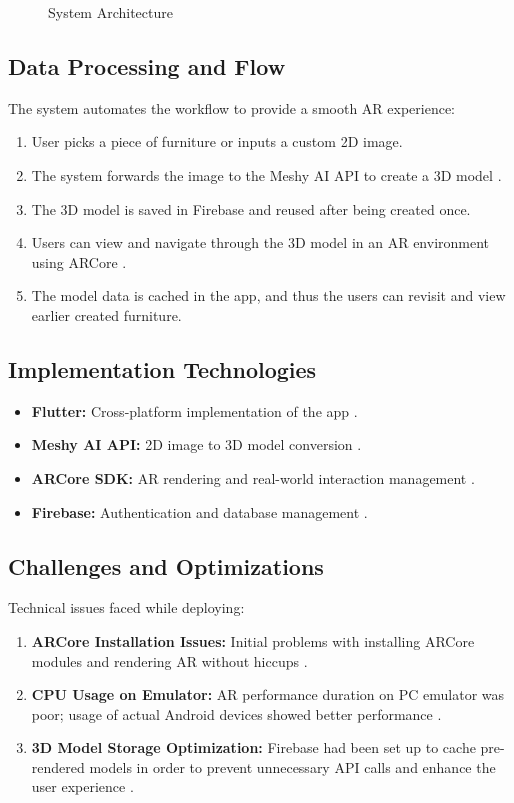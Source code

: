 \documentclass[12pt, a4paper]{article}
\begin{document}
\begin{figure}[htbp]
    \centering
    \caption{System Architecture}
    \label{fig:system_architecture}
\end{figure}

\subsection{Data Processing and Flow}
The system automates the workflow to provide a smooth AR experience:
\begin{enumerate}
    \item User picks a piece of furniture or inputs a custom 2D image.
    \item The system forwards the image to the Meshy AI API to create a 3D model \cite{5}.
    \item The 3D model is saved in Firebase and reused after being created once.
    \item Users can view and navigate through the 3D model in an AR environment using ARCore \cite{2}.
    \item The model data is cached in the app, and thus the users can revisit and view earlier created furniture.
\end{enumerate}

\subsection{Implementation Technologies}
\begin{itemize}
    \item \textbf{Flutter:} Cross-platform implementation of the app \cite{3}.
    \item \textbf{Meshy AI API:} 2D image to 3D model conversion \cite{5}.
    \item \textbf{ARCore SDK:} AR rendering and real-world interaction management \cite{2}.
    \item \textbf{Firebase:} Authentication and database management \cite{4}.
\end{itemize}

\subsection{Challenges and Optimizations}
Technical issues faced while deploying:
\begin{enumerate}
    \item \textbf{ARCore Installation Issues:} Initial problems with installing ARCore modules and rendering AR without hiccups \cite{17}.
    \item \textbf{CPU Usage on Emulator:} AR performance duration on PC emulator was poor; usage of actual Android devices showed better performance \cite{9}.
    \item \textbf{3D Model Storage Optimization:} Firebase had been set up to cache pre-rendered models in order to prevent unnecessary API calls and enhance the user experience \cite{19}.
\end{enumerate}
\end{document}
